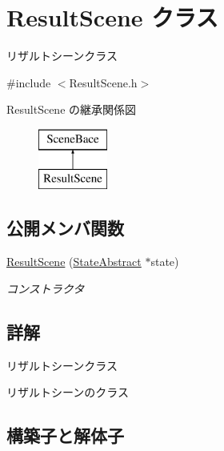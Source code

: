 \hypertarget{class_result_scene}{}\section{Result\+Scene クラス}
\label{class_result_scene}


リザルトシーンクラス  




{\ttfamily \#include $<$Result\+Scene.\+h$>$}

Result\+Scene の継承関係図\begin{figure}[H]
\begin{center}
\leavevmode
\includegraphics[height=2.000000cm]{class_result_scene}
\end{center}
\end{figure}
\subsection*{公開メンバ関数}
\begin{DoxyCompactItemize}
\item 
\mbox{\hyperlink{class_result_scene_aa3eb389e877dcf1062b42991903ca7c2}{Result\+Scene}} (\mbox{\hyperlink{class_scene_bace_1_1_state_abstract}{State\+Abstract}} $\ast$state)
\begin{DoxyCompactList}\small\item\em コンストラクタ \end{DoxyCompactList}\end{DoxyCompactItemize}


\subsection{詳解}
リザルトシーンクラス 

リザルトシーンのクラス 

\subsection{構築子と解体子}
\mbox{\label{class_result_scene_aa3eb389e877dcf1062b42991903ca7c2}} 
